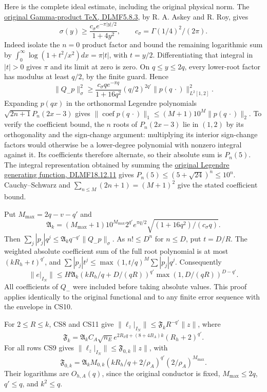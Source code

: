 \documentclass[11pt]{article}
\begin{document}
Here is the complete ideal estimate, including the original physical norm. The \href{https://dlmf.nist.gov/5.8.E3}{original Gamma-product TeX, DLMF5.8.3}, by R. A. Askey and R. Roy, gives \[
 \sigma(y)\ge\frac{c_\sigma e^{-\pi|y|/2}}{1+4y^2},\qquad c_\sigma=\Gamma(1/4)^2/(2\pi).
\] Indeed isolate the \(n=0\) product factor and bound the remaining logarithmic sum by \(\int_0^\infty\log(1+t^2/x^2)dx=\pi|t|\), with \(t=y/2\). Differentiating that integral in \(|t|>0\) gives \(\pi\) and its limit at zero is zero. On \(q\le y\le2q\), every lower-root factor has modulus at least \(q/2\), by the finite guard. Hence \[
 \|Q_-p\|_\sigma^2\ge\frac{c_\sigma q e^{-\pi q}}{1+16q^2}(q/2)^{2q'}\|p(q\,\cdot)\|_{L^2[1,2]}^2.
\] Expanding \(p(qx)\) in the orthonormal Legendre polynomials \(\sqrt{2n+1}P_n(2x-3)\) gives \(\|\operatorname{coef}p(q\,\cdot)\|_1\le(M+1)10^M\|p(q\,\cdot)\|_2\). To verify the coefficient bound, the \(n\) roots of \(P_n(2x-3)\) lie in \((1,2)\) by its orthogonality and the sign-change argument: multiplying its interior sign-change factors would otherwise be a lower-degree polynomial with nonzero integral against it. Its coefficients therefore alternate, so their absolute sum is \(P_n(5)\). The integral representation obtained by summing the \href{https://dlmf.nist.gov/18.12.E11}{original Legendre generating function, DLMF18.12.11} gives \(P_n(5)\le(5+\sqrt{24})^n\le10^n\). Cauchy--Schwarz and \(\sum_{n\le M}(2n+1)=(M+1)^2\) give the stated coefficient bound.

Put \(M_{\max}=2q-v-q'\) and \[
 \mathfrak A_k=(M_{\max}+1)10^{M_{\max}}2^{q'}e^{\pi q/2}
 \sqrt{(1+16q^2)/(c_\sigma q)}.
\] Then \(\sum_j|p_j|q^j\le\mathfrak A_kq^{-q'}\|Q_-p\|_\sigma\). As \(n!\le D^n\) for \(n\le D\), put \(t=D/R\). The weighted absolute coefficient sum of the full root polynomial is at most \((kR_h+t)^{q'}\), and \(\sum|p_j|t^j\le\max(1,t/q)^M\sum|p_j|q^j\). Consequently \[
 \boxed{\|e|_{I_N}\|\le H\mathfrak A_k
 (kR_h/q+D/(qR))^{q'}\max(1,D/(qR))^{D-q'}.}
 \tag{CS11}
\] All coefficients of \(Q_-\) were included before taking absolute values. This proof applies identically to the original functional and to any finite error sequence with the envelope in CS10.

For \(2\le R\le k\), CS8 and CS11 give \(\|\ell_z|_{I_N}\|\le\mathfrak F_kR^{-q'}\|z\|\), where \[
 \mathfrak F_k=\mathfrak A_kC_A\sqrt{n_E}
 e^{2R_hq+(8+4B_A)k}(R_h+2)^{q'}.
\] For all rows CS9 gives \(\|\ell_z|_{I_N}\|\le\mathfrak F_{0,k}\|z\|\), with \[
 \mathfrak F_{0,k}=\mathfrak A_kM_{0,k}
 (kR_h/q+2/\rho_A)^{q'}(2/\rho_A)^{M_{\max}}.
 \tag{CS12}
\] Their logarithms are \(O_{h,A}(q)\), since the original conductor is fixed, \(M_{\max}\le2q\), \(q'\le q\), and \(k^2\le q\).
\end{document}
